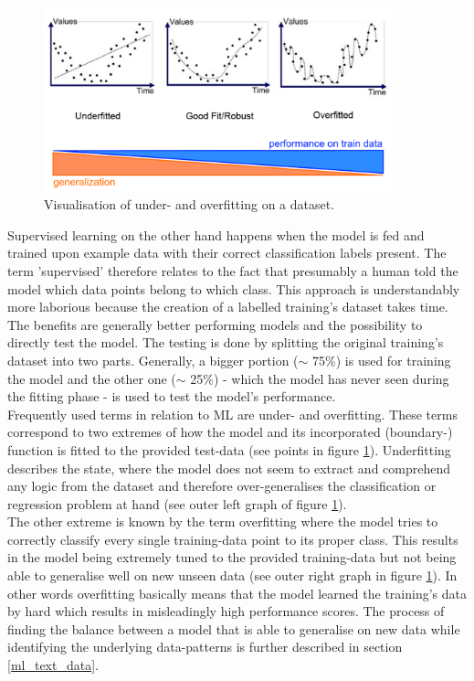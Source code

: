 \begin{figure}[h]
   \centering
   \includegraphics[width=0.9\textwidth]{img/over_underfitting}
   \caption{Visualisation of under- and overfitting on a dataset.}
   \label{fig:over_underfitting}
\end{figure}

Supervised learning on the other hand happens when the model is fed and trained upon example data with their correct classification labels present. The term 'supervised' therefore relates to the fact that presumably a human told the model which data points belong to which class. This approach is understandably more laborious because the creation of a labelled training's dataset takes time. The benefits are generally better performing models and the possibility to directly test the model. The testing is done by splitting the original training's dataset into two parts. Generally, a bigger portion ($\sim$ 75\%) is used for training the model and the other one ($\sim$ 25\%) - which the model has never seen during the fitting phase - is used to test the model's performance. \\
\newline
Frequently used terms in relation to ML are under- and overfitting. These terms correspond to two extremes of how the model and its incorporated (boundary-) function is fitted to the provided test-data (see points in figure \ref{fig:over_underfitting}). Underfitting describes the state, where the model does not seem to extract and comprehend any logic from the dataset and therefore over-generalises the classification or regression problem at hand (see outer left graph of figure \ref{fig:over_underfitting}). \\
The other extreme is known by the term overfitting where the model tries to correctly classify every single training-data point to its proper class. This results in the model being extremely tuned to the provided training-data but not being able to generalise well on new unseen data (see outer right graph in figure \ref{fig:over_underfitting}). In other words overfitting basically means that the model learned the training's data by hard which results in misleadingly high performance scores. The process of finding the balance between a model that is able to generalise on new data while identifying the underlying data-patterns is further described in section \ref{ml_text_data}.


